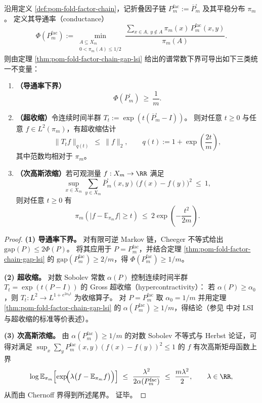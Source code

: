 \begin{corollary}\label{cor:pom-fold-factor-chain-derived-invariants}
沿用定义 \ref{def:pom-fold-factor-chain}，记折叠因子链 \(P^{\mathrm{fac}}_m:=\overline P^{\square}_m\) 及其平稳分布 \(\pi_m\)。
定义其导通率（conductance）
\[
\Phi(P^{\mathrm{fac}}_m)
:=\min_{\substack{A\subseteq X_m\\0<\pi_m(A)\le 1/2}}
\frac{\sum_{x\in A,\ y\notin A}\pi_m(x)\,P^{\mathrm{fac}}_m(x,y)}{\pi_m(A)}.
\]
则由定理 \ref{thm:pom-fold-factor-chain-gap-lsi} 给出的谱常数下界可导出如下三类统一不变量：
\begin{enumerate}
  \item \textbf{（导通率下界）}
  \[
  \Phi(\overline P^{\square}_m)\ \ge\ \frac{1}{m}.
  \]
  \item \textbf{（超收缩）}令连续时间半群
  \(
  T_t:=\exp(t(\overline P^{\square}_m-I))
  \)。
  则对任意 \(t\ge 0\) 与任意 \(f\in L^2(\pi_m)\)，有超收缩估计
  \[
  \|T_t f\|_{q(t)}\ \le\ \|f\|_2,
  \qquad
  q(t):=1+\exp\!\left(\frac{2t}{m}\right),
  \]
  其中范数均相对于 \(\pi_m\)。
  \item \textbf{（次高斯浓缩）}若可观测量 \(f:X_m\to\RR\) 满足
  \[
  \sup_{x\in X_m}\sum_{y\in X_m}\overline P^{\square}_m(x,y)\,\bigl(f(x)-f(y)\bigr)^2\ \le\ 1,
  \]
  则对任意 \(t\ge 0\) 有
  \[
  \pi_m\!\left(\bigl|f-\mathbb E_{\pi_m}f\bigr|\ge t\right)
  \ \le\ 2\exp\!\left(-\frac{t^2}{2m}\right).
  \]
\end{enumerate}
\end{corollary}

\begin{proof}
\textbf{(1) 导通率下界。}
对有限可逆 Markov 链，Cheeger 不等式给出 \(\mathrm{gap}(P)\le 2\Phi(P)\)。
将其应用于 \(P=P^{\mathrm{fac}}_m\)，并结合定理 \ref{thm:pom-fold-factor-chain-gap-lsi} 的 \(\mathrm{gap}(P^{\mathrm{fac}}_m)\ge 2/m\)，得 \(\Phi(P^{\mathrm{fac}}_m)\ge 1/m\)。
\par
\textbf{(2) 超收缩。}
对数 Sobolev 常数 \(\alpha(P)\) 控制连续时间半群 \(T_t=\exp(t(P-I))\) 的 Gross 超收缩（hypercontractivity）：
若 \(\alpha(P)\ge \alpha_0\)，则 \(T_t:L^2\to L^{1+e^{2\alpha_0 t}}\) 为收缩算子。
对 \(P=P^{\mathrm{fac}}_m\) 取 \(\alpha_0=1/m\) 并用定理 \ref{thm:pom-fold-factor-chain-gap-lsi} 的 \(\alpha(P^{\mathrm{fac}}_m)\ge 1/m\)，得结论（参见 \cite{LevinPeresWilmer2009MarkovMixing} 中对 LSI 与超收缩的标准等价表述）。
\par
\textbf{(3) 次高斯浓缩。}
由 \(\alpha(P^{\mathrm{fac}}_m)\ge 1/m\) 的对数 Sobolev 不等式与 Herbst 论证，可得对满足
\(
\sup_x\sum_y P^{\mathrm{fac}}_m(x,y)(f(x)-f(y))^2\le 1
\)
的 \(f\) 有次高斯矩母函数上界
\[
\log \mathbb E_{\pi_m}\!\left[\exp\!\Bigl(\lambda\bigl(f-\mathbb E_{\pi_m}f\bigr)\Bigr)\right]
\ \le\ \frac{\lambda^2}{2\alpha(P^{\mathrm{fac}}_m)}
\ \le\ \frac{m\lambda^2}{2},
\qquad \lambda\in\RR,
\]
从而由 Chernoff 界得到所述尾界。
证毕。
\end{proof}

